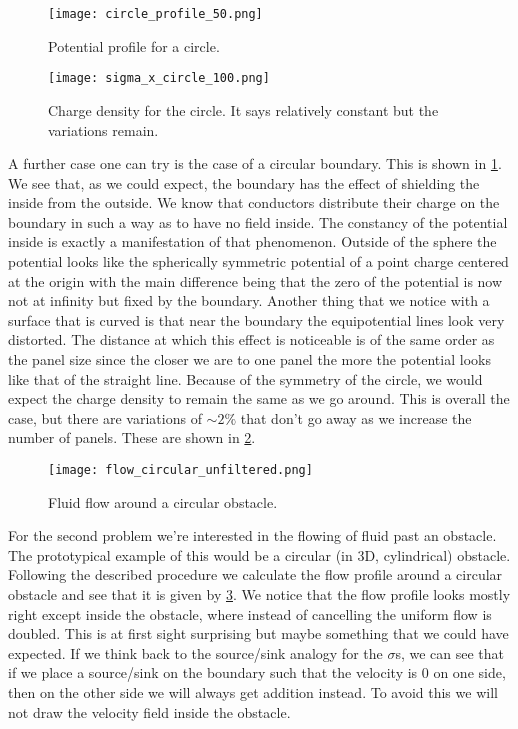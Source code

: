 \documentclass[10pt,a4paper,twocolumn]{article}
\begin{document}
\begin{figure}[!h]
    \centering
    \texttt{[image: circle\_profile\_50.png]}
    \caption{Potential profile for a circle.}
    \label{fig:circle_profile}
\end{figure}

\begin{figure}[!h]
    \centering
    \texttt{[image: sigma\_x\_circle\_100.png]}
    \caption{Charge density for the circle. It says relatively constant but the variations remain.}
    \label{fig:sigma_x_circle}
\end{figure}

A further case one can try is the case of a circular boundary. This is shown in \cref{fig:circle_profile}. We see that, as we could expect, the boundary has the effect of shielding the inside from the outside. We know that conductors distribute their charge on the boundary in such a way as to have no field inside. The constancy of the potential inside is exactly a manifestation of that phenomenon. Outside of the sphere the potential looks like the spherically symmetric potential of a point charge centered at the origin with the main difference being that the zero of the potential is now not at infinity but fixed by the boundary. Another thing that we notice with a surface that is curved is that near the boundary the equipotential lines look very distorted. The distance at which this effect is noticeable is of the same order as the panel size since the closer we are to one panel the more the potential looks like that of the straight line. Because of the symmetry of the circle, we would expect the charge density to remain the same as we go around. This is overall the case, but there are variations of $\sim\!2\%$ that don't go away as we increase the number of panels. These are shown in \cref{fig:sigma_x_circle}.

\begin{figure}[!h]
    \centering
    \texttt{[image: flow\_circular\_unfiltered.png]}
    \caption{Fluid flow around a circular obstacle.}
    \label{fig:flow_circular_unfiltered}
\end{figure}

For the second problem we're interested in the flowing of fluid past an obstacle. The prototypical example of this would be a circular (in 3D, cylindrical) obstacle. Following the described procedure we calculate the flow profile around a circular obstacle and see that it is given by \cref{fig:flow_circular_unfiltered}. We notice that the flow profile looks mostly right except inside the obstacle, where instead of cancelling the uniform flow is doubled. This is at first sight surprising but maybe something that we could have expected. If we think back to the source/sink analogy for the $\sigma$s, we can see that if we place a source/sink on the boundary such that the velocity is $0$ on one side, then on the other side we will always get addition instead. To avoid this we will not draw the velocity field inside the obstacle.
\end{document}
